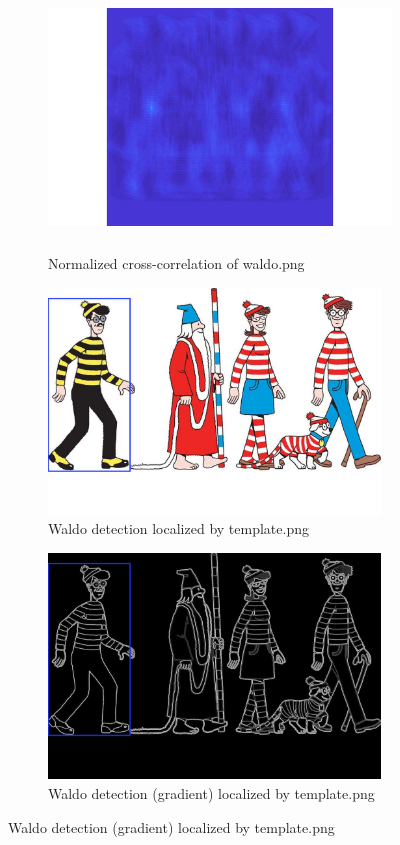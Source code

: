 \documentclass{csc_assignment4}
\begin{document}
\begin{description}
\begin{enumerate}[label=(\alph*)]
\begin{figure}[h]
\centering
\begin{subfigure}{0.5\textwidth}
\centering
\includegraphics[width=1.2\linewidth, height=7cm]{q3b1.jpg}
\vspace{-2mm}
\caption{Normalized cross-correlation of waldo.png}
\end{subfigure}
\begin{subfigure}{0.5\textwidth}
\centering
\includegraphics[width=1.2\linewidth, height=6cm]{q3b2.jpg}
\vspace{-15mm}
\caption{Waldo detection localized by template.png}
\end{subfigure}
\begin{subfigure}{0.5\textwidth}
\centering
\includegraphics[width=1.2\linewidth, height=6cm]{q3b3.jpg}
\vspace{-5mm}
\caption{Waldo detection (gradient) localized by template.png}
\end{subfigure}
\end{figure}
\clearpage



\end{enumerate}
\end{description}
\end{document}
